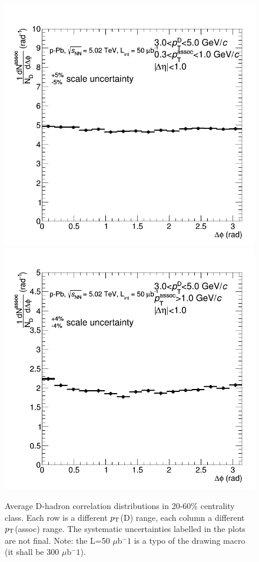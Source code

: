 \begin{figure}
{\includegraphics[width=0.32\linewidth]{figuresVsCent/Averages/2060/CanvaAndVariedHistoWeightedAverageDzeroDstarDplus_pPb_Pt3to5assocPt03to1.png}}
{\includegraphics[width=0.32\linewidth]{figuresVsCent/Averages/2060/CanvaAndVariedHistoWeightedAverageDzeroDstarDplus_pPb_Pt3to5assocPt1to99.png}}
 \caption{Average D-hadron correlation distributions in 20-60\% centrality class. Each row is a different $p_{\rm T}$(D) range, each column a different $p_{\rm T}$(assoc) range. The systematic uncertainties labelled in the plots are not final. Note: the L=50 $\mu$b$^-1$ is a typo of the drawing macro (it shall be 300 $\mu$b$^-1$).}
\label{fig:avgcorr2060}
\end{figure}

